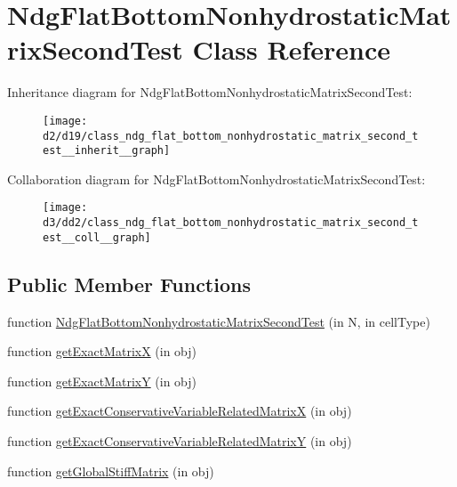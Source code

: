 \hypertarget{class_ndg_flat_bottom_nonhydrostatic_matrix_second_test}{}\section{Ndg\+Flat\+Bottom\+Nonhydrostatic\+Matrix\+Second\+Test Class Reference}
\label{class_ndg_flat_bottom_nonhydrostatic_matrix_second_test}


Inheritance diagram for Ndg\+Flat\+Bottom\+Nonhydrostatic\+Matrix\+Second\+Test\+:
\nopagebreak
\begin{figure}[H]
\begin{center}
\leavevmode
\texttt{[image: d2/d19/class\_ndg\_flat\_bottom\_nonhydrostatic\_matrix\_second\_test\_\_inherit\_\_graph]}
\end{center}
\end{figure}


Collaboration diagram for Ndg\+Flat\+Bottom\+Nonhydrostatic\+Matrix\+Second\+Test\+:
\nopagebreak
\begin{figure}[H]
\begin{center}
\leavevmode
\texttt{[image: d3/dd2/class\_ndg\_flat\_bottom\_nonhydrostatic\_matrix\_second\_test\_\_coll\_\_graph]}
\end{center}
\end{figure}
\subsection*{Public Member Functions}
\begin{DoxyCompactItemize}
\item 
function \hyperlink{class_ndg_flat_bottom_nonhydrostatic_matrix_second_test_a10e031cb42862fa9b01029e62054cf58}{Ndg\+Flat\+Bottom\+Nonhydrostatic\+Matrix\+Second\+Test} (in N, in cell\+Type)
\item 
function \hyperlink{class_ndg_flat_bottom_nonhydrostatic_matrix_second_test_a577687b6e8006b47730a64bfc6bcc943}{get\+Exact\+MatrixX} (in obj)
\item 
function \hyperlink{class_ndg_flat_bottom_nonhydrostatic_matrix_second_test_a7aa7fc337acd6d0dec8662c750710830}{get\+Exact\+MatrixY} (in obj)
\item 
function \hyperlink{class_ndg_flat_bottom_nonhydrostatic_matrix_second_test_a460e6ced7f269961e1e9bb20e56e46d0}{get\+Exact\+Conservative\+Variable\+Related\+MatrixX} (in obj)
\item 
function \hyperlink{class_ndg_flat_bottom_nonhydrostatic_matrix_second_test_aaf0bd3d005f580745eace31812822d6e}{get\+Exact\+Conservative\+Variable\+Related\+MatrixY} (in obj)
\item 
function \hyperlink{class_ndg_flat_bottom_nonhydrostatic_matrix_second_test_ab4873fd058f6eba15314c449c2a1964f}{get\+Global\+Stiff\+Matrix} (in obj)
\end{DoxyCompactItemize}
